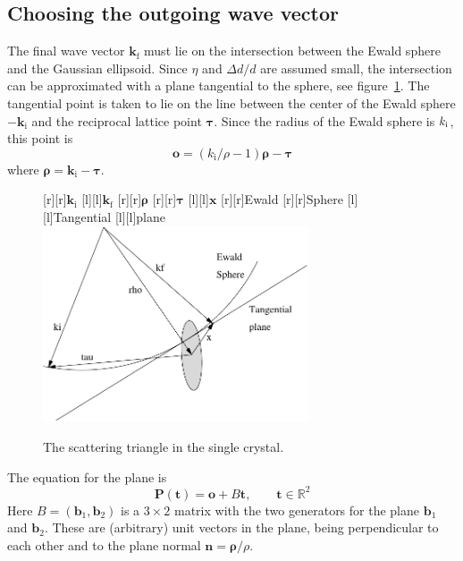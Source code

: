 \subsection{Choosing the outgoing wave vector}

The final wave vector $\boldsymbol{k}_\textrm{f}$ must lie on the
intersection between the Ewald sphere and the Gaussian ellipsoid. Since
$\eta$ and $\Delta d/d$ are assumed small, the intersection can be
approximated with a plane tangential to the sphere, see
figure~\ref{fig:crystal-scattering-tri}. The tangential point is taken
to lie on the line between the center of the Ewald sphere
$-\boldsymbol{k}_\textrm{i}$ and the reciprocal lattice point
$\boldsymbol{\tau}$. Since the radius of the Ewald sphere is $k_{\rm
  i}$, this point is
$$ \boldsymbol{o}=(k_\textrm{i}/\rho - 1)\boldsymbol{\rho} - \boldsymbol{\tau} $$
where $\boldsymbol{\rho} = \boldsymbol{k}_\textrm{i} - \boldsymbol{\tau}$.
\begin{figure}[t]
  \begin{center}
    [r][r]{$\boldsymbol{k}_\textrm{i}$}
    [l][l]{$\boldsymbol{k}_\textrm{f}$}
    [r][r]{$\boldsymbol{\rho}$}
    [r][r]{$\boldsymbol{\tau}$}
    [l][l]{$\boldsymbol{x}$}
    [r][r]{Ewald}
    [r][r]{Sphere}
    [l][l]{Tangential}
    [l][l]{plane}
    \includegraphics[width=0.7\textwidth]{figures/recip-detail}
  \end{center}
\caption{The scattering triangle in the single crystal.}
\label{fig:crystal-scattering-tri}
\end{figure}

The equation for the plane is
\begin{equation}
  \label{eq:crystal-tangent-plane}
    \boldsymbol{P}(\boldsymbol{t}) = \boldsymbol{o} + B \boldsymbol{t}, \qquad
    \boldsymbol{t} \in \mathbb{R}^2
\end{equation}
Here $B = (\boldsymbol{b}_1, \boldsymbol{b}_2)$ is a $3\times 2$ matrix
with the two generators for the plane $\boldsymbol{b}_1$ and
$\boldsymbol{b}_2$. These are (arbitrary) unit vectors in the plane,
being perpendicular to
each other and to the plane normal $\boldsymbol{n} =
\boldsymbol{\rho}/\rho$.

